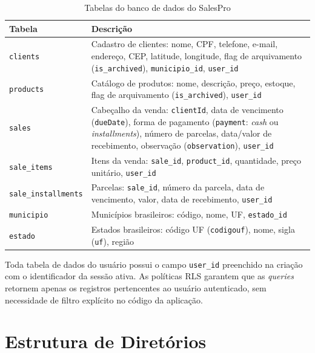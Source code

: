 \documentclass[
	12pt,				%
	oneside,			%
	a4paper,			%
	english,			%
	brazil				%
	]{abntex2}
\begin{document}
\begin{table}[htb]
\centering
\footnotesize
\begin{tabular}{|p{3.2cm}|p{9.8cm}|}
  \hline
  \textbf{Tabela} & \textbf{Descrição} \\
  \hline
  \texttt{clients} & Cadastro de clientes: nome, CPF, telefone, e-mail, endereço, CEP, latitude, longitude, flag de arquivamento (\texttt{is\_archived}), \texttt{municipio\_id}, \texttt{user\_id} \\
  \hline
  \texttt{products} & Catálogo de produtos: nome, descrição, preço, estoque, flag de arquivamento (\texttt{is\_archived}), \texttt{user\_id} \\
  \hline
  \texttt{sales} & Cabeçalho da venda: \texttt{clientId}, data de vencimento (\texttt{dueDate}), forma de pagamento (\texttt{payment}: \textit{cash} ou \textit{installments}), número de parcelas, data/valor de recebimento, observação (\texttt{observation}), \texttt{user\_id} \\
  \hline
  \texttt{sale\_items} & Itens da venda: \texttt{sale\_id}, \texttt{product\_id}, quantidade, preço unitário, \texttt{user\_id} \\
  \hline
  \texttt{sale\_installments} & Parcelas: \texttt{sale\_id}, número da parcela, data de vencimento, valor, data de recebimento, \texttt{user\_id} \\
  \hline
  \texttt{municipio} & Municípios brasileiros: código, nome, UF, \texttt{estado\_id} \\
  \hline
  \texttt{estado} & Estados brasileiros: código UF (\texttt{codigouf}), nome, sigla (\texttt{uf}), região \\
  \hline
\end{tabular}
\caption{Tabelas do banco de dados do SalesPro}
\label{tab:banco}
\end{table}

Toda tabela de dados do usuário possui o campo \texttt{user\_id} preenchido na criação com o identificador da sessão ativa. As políticas RLS garantem que as \textit{queries} retornem apenas os registros pertencentes ao usuário autenticado, sem necessidade de filtro explícito no código da aplicação.

\section{Estrutura de Diretórios}
\end{document}
